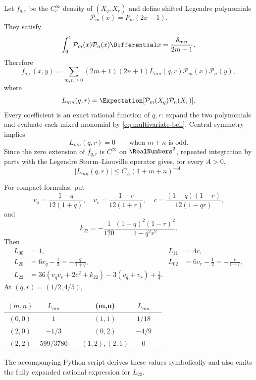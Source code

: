 \documentclass[11pt,a4paper]{article}
\theoremstyle{definition}
\theoremstyle{remark}
\begin{document}
Let $f_{q,r}$ be the $C_c^\infty$ density of $(X_q,X_r)$ and define shifted Legendre polynomials
\begin{equation}
  \mathcal P_m(x)=P_m(2x-1).
  \label{eq:shifted-Legendre}
\end{equation}
They satisfy
\[
  \int_0^1\mathcal P_m(x)\mathcal P_n(x)\Differential x
    =\frac{\delta_{mn}}{2m+1}.
\]
Therefore
\begin{equation}
 f_{q,r}(x,y)
  =\sum_{m,n\ge0}(2m+1)(2n+1)L_{mn}(q,r)
     \mathcal P_m(x)\mathcal P_n(y),
 \label{eq:Legendre-expansion}
\end{equation}
where
\begin{equation}
  L_{mn}(q,r)=\Expectation[\mathcal P_m(X_q)\mathcal P_n(X_r)].
  \label{eq:Lmn}
\end{equation}
Every coefficient is an exact rational function of $q,r$: expand the two polynomials and evaluate each mixed monomial by \eqref{eq:multivariate-bell}.  Central symmetry implies
\begin{equation}
  L_{mn}(q,r)=0\qquad\text{when }m+n\text{ is odd}.
  \label{eq:Legendre-parity}
\end{equation}
Since the zero extension of $f_{q,r}$ is $C^\infty$ on $\RealNumbers^2$, repeated integration by parts with the Legendre Sturm--Liouville operator gives, for every $A>0$,
\begin{equation}
  |L_{mn}(q,r)|\le C_A(1+m+n)^{-A}.
  \label{eq:Legendre-decay}
\end{equation}

For compact formulas, put
\begin{equation}
 v_q=\frac{1-q}{12(1+q)},\quad
 v_r=\frac{1-r}{12(1+r)},\quad
 c=\frac{(1-q)(1-r)}{12(1-qr)},
 \label{eq:vq-vr-c}
\end{equation}
and
\begin{equation}
  k_{22}=-\frac1{120}
  \frac{(1-q)^2(1-r)^2}{1-q^2r^2}.
  \label{eq:k22}
\end{equation}
Then
\begin{align}
 L_{00}&=1, & L_{11}&=4c,\\
 L_{20}&=6v_q-\frac12=-\frac{q}{1+q},
 &L_{02}&=6v_r-\frac12=-\frac{r}{1+r},\\
 L_{22}&=36(v_qv_r+2c^2+k_{22})
          -3(v_q+v_r)+\frac14.
 \label{eq:low-Legendre}
\end{align}
At $(q,r)=(1/2,4/5)$,
\begin{center}
\begin{tabular}{c c c@{\qquad}c c c}
\toprule
$(m,n)$&$L_{mn}$&&(m,n)&$L_{mn}$\\
\midrule
$(0,0)$&$1$&&$(1,1)$&$1/18$\\
$(2,0)$&$-1/3$&&$(0,2)$&$-4/9$\\
$(2,2)$&$599/3780$&&$(1,2),(2,1)$&$0$\\
\bottomrule
\end{tabular}
\end{center}
The accompanying Python script derives these values symbolically and also emits the fully expanded rational expression for $L_{22}$.
\end{document}
